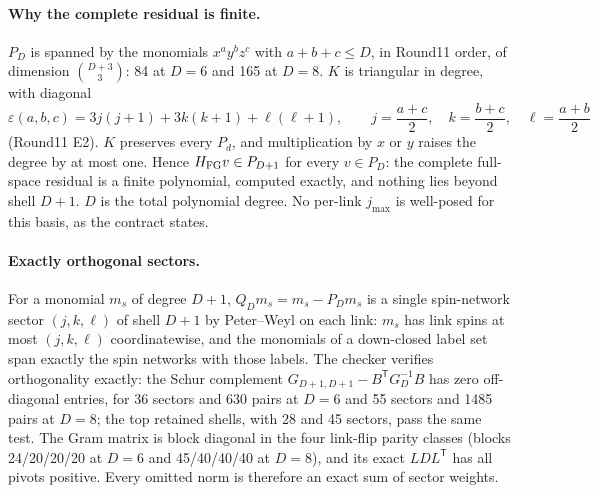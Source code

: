 \paragraph{Why the complete residual is finite.}
$P_D$ is spanned by the monomials $x^ay^bz^c$ with $a+b+c\le D$, in Round11
order, of dimension $\binom{D+3}3$: 84 at $D=6$ and 165 at $D=8$. $K$ is
triangular in degree, with diagonal
\begin{equation}
 \varepsilon(a,b,c)=3j(j+1)+3k(k+1)+\ell(\ell+1),\qquad
 j=\frac{a+c}2,\quad k=\frac{b+c}2,\quad \ell=\frac{a+b}2
 \label{eq:az2-eps}
\end{equation}
(Round11 E2). $K$ preserves every $P_d$, and multiplication by $x$ or $y$
raises the degree by at most one. Hence $H_{\rm FG}v\in P_{D+1}$ for every
$v\in P_D$: the complete full-space residual is a finite polynomial, computed
exactly, and nothing lies beyond shell $D+1$. $D$ is the total polynomial
degree. No per-link $j_{\max}$ is well-posed for this basis, as the contract
states.

\paragraph{Exactly orthogonal sectors.}
For a monomial $m_s$ of degree $D+1$, $Q_Dm_s=m_s-P_Dm_s$ is a single
spin-network sector $(j,k,\ell)$ of shell $D+1$ by Peter--Weyl on each link:
$m_s$ has link spins at most $(j,k,\ell)$ coordinatewise, and the monomials of
a down-closed label set span exactly the spin networks with those labels. The
checker verifies orthogonality exactly: the Schur complement
$G_{D+1,D+1}-B^{\mathsf T}G_D^{-1}B$ has zero off-diagonal entries, for 36
sectors and 630 pairs at $D=6$ and 55 sectors and 1485 pairs at $D=8$; the
top retained shells, with 28 and 45 sectors, pass the same test. The Gram
matrix is block diagonal in the four link-flip parity classes (blocks
24/20/20/20 at $D=6$ and 45/40/40/40 at $D=8$), and its exact
$LDL^{\mathsf T}$ has all pivots positive. Every omitted norm is therefore an
exact sum of sector weights.


